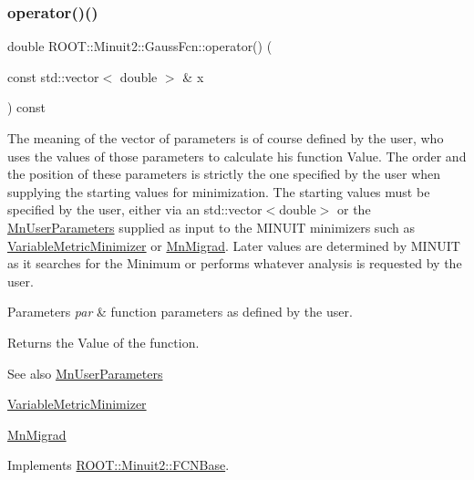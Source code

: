\subsubsection{\texorpdfstring{operator()()}{operator()()}}
{\footnotesize\ttfamily double R\+O\+O\+T\+::\+Minuit2\+::\+Gauss\+Fcn\+::operator() (\begin{DoxyParamCaption}\item[{const std\+::vector$<$ double $>$ \&}]{x }\end{DoxyParamCaption}) const\hspace{0.3cm}{\ttfamily [virtual]}}

The meaning of the vector of parameters is of course defined by the user, who uses the values of those parameters to calculate his function Value. The order and the position of these parameters is strictly the one specified by the user when supplying the starting values for minimization. The starting values must be specified by the user, either via an std\+::vector$<$double$>$ or the \mbox{\hyperlink{classROOT_1_1Minuit2_1_1MnUserParameters}{Mn\+User\+Parameters}} supplied as input to the M\+I\+N\+U\+IT minimizers such as \mbox{\hyperlink{classROOT_1_1Minuit2_1_1VariableMetricMinimizer}{Variable\+Metric\+Minimizer}} or \mbox{\hyperlink{classROOT_1_1Minuit2_1_1MnMigrad}{Mn\+Migrad}}. Later values are determined by M\+I\+N\+U\+IT as it searches for the Minimum or performs whatever analysis is requested by the user.


\begin{DoxyParams}{Parameters}
{\em par} & function parameters as defined by the user.\\
\hline
\end{DoxyParams}
\begin{DoxyReturn}{Returns}
the Value of the function.
\end{DoxyReturn}
\begin{DoxySeeAlso}{See also}
\mbox{\hyperlink{classROOT_1_1Minuit2_1_1MnUserParameters}{Mn\+User\+Parameters}} 

\mbox{\hyperlink{classROOT_1_1Minuit2_1_1VariableMetricMinimizer}{Variable\+Metric\+Minimizer}} 

\mbox{\hyperlink{classROOT_1_1Minuit2_1_1MnMigrad}{Mn\+Migrad}} 
\end{DoxySeeAlso}


Implements \mbox{\hyperlink{classROOT_1_1Minuit2_1_1FCNBase_ae4a86bd94d0d0f5ca6fc8f8ab2bb43cd}{R\+O\+O\+T\+::\+Minuit2\+::\+F\+C\+N\+Base}}.

\mbox{\label{classROOT_1_1Minuit2_1_1GaussFcn_a7098b4a70f063917479335d5f1d7473a}} 
